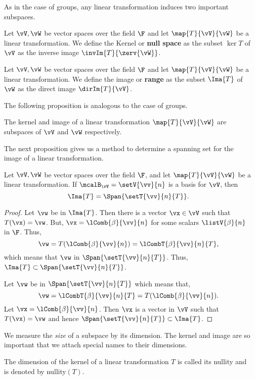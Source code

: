 As in the case of groups, any linear transformation induces two important subspaces.
\begin{Definition}[name=Kernel]
    Let $\vV,\vW$ be vector spaces over the field $\F$ and let $\map{T}{\vV}{\vW}$ be a linear transformation. 
    We define the Kernel or \textbf{null space} as the subset $\ker{T}$ of $\vV$ as the inverse image
    $\invIm{T}{\zerv{\vW}}$.
\end{Definition}
\begin{Definition}[name=Image]
    Let $\vV,\vW$ be vector spaces over the field $\F$ and let $\map{T}{\vV}{\vW}$ be a linear transformation.
    We define the image or \textbf{range} as the subset $\Ima{T}$ of $\vW$ as the direct image
    $\dirIm{T}{\vV}$.
\end{Definition}
The following proposition is analogous to the case of groups.
\begin{Proposition}
    The kernel and image of a linear transformation $\map{T}{\vV}{\vW}$ are subspaces of $\vV$ and $\vW$
    respectively.
\end{Proposition}
The next proposition gives us a method to determine a spanning set for the image of a linear transformation.
\begin{Proposition}
    Let $\vV,\vW$ be vector spaces over the field $\F$, and let $\map{T}{\vV}{\vW}$ be a linear
    transformation. If $\mcalB_{\vV} = \setV{\vv}{n}$ is a basis for $\vV$, then
    \[\Ima{T} = \Span{\setT{\vv}{n}{T}}.\]
\end{Proposition}
\begin{proof}
    Let $\vw$ be in $\Ima{T}$. Then there is a vector $\vx \in \vV$ such that $T(\vx) = \vw$. But,
    $\vx = \lComb{\beta}{\vv}{n}$ for some scalars $\listV{\beta}{n}$ in $\F$. Thus,
    \[\vw = T(\lComb{\beta}{\vv}{n}) = \lCombT{\beta}{\vv}{n}{T},\]
    which means that $\vw$ in $\Span{\setT{\vv}{n}{T}}$. Thus, $\Ima{T} \subset \Span{\setT{\vv}{n}{T}}$.

    Let $\vw$ be in $\Span{\setT{\vv}{n}{T}}$ which means that,
    \[\vw = \lCombT{\beta}{\vv}{n}{T} = T(\lComb{\beta}{\vv}{n}).\]
    Let $\vx = \lComb{\beta}{\vv}{n}$. Then $\vx$ is a vector in $\vV$ such that $T(\vx) = \vw$ and hence
    $ \Span{\setT{\vv}{n}{T}} \subset \Ima{T}$.
\end{proof}
We measure the \emph{size} of a subspace by its dimension. The kernel and image are so important that we
attach special names to their dimensions.
\begin{Definition}[name=Nullity]
    The dimension of the kernel of a linear transformation $T$ is called its nullity and is denoted by
    nullity$(T)$.
\end{Definition}
